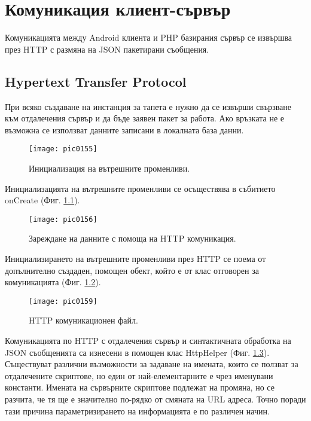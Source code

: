 \newpage
\chapter{Комуникация клиент-сървър}
\label{chapter06}

Комуникацията между Android клиента и PHP базирания сървър се извършва през HTTP с размяна на JSON пакетирани съобщения. 

\section{Hypertext Transfer Protocol}

При всяко създаване на инстанция за тапета е нужно да се извърши свързване към отдалечения сървър и да бъде заявен пакет за работа. Ако връзката не е възможна се използват данните записани в локалната база данни. 

\begin{figure}[h]
  \centering
  \texttt{[image: pic0155]}
  \caption{Инициализация на вътрешните променливи.}
\label{fig:pic0155}
\end{figure}
\FloatBarrier

Инициализацията на вътрешните променливи се осъществява в събитието onCreate (Фиг. \ref{fig:pic0155}).

\begin{figure}[h]
  \centering
  \texttt{[image: pic0156]}
  \caption{Зареждане на данните с помоща на HTTP комуникация.}
\label{fig:pic0156}
\end{figure}
\FloatBarrier

Инициализирането на вътрешните променливи през HTTP се поема от допълнително създаден, помощен обект, който е от клас отговорен за комуникацията (Фиг. \ref{fig:pic0156}). 

\begin{figure}[h]
  \centering
  \texttt{[image: pic0159]}
  \caption{HTTP комуникационен файл.}
\label{fig:pic0159}
\end{figure}
\FloatBarrier

Комуникацията  по HTTP с отдалечения сървър и синтактичната обработка на JSON съобщенията са изнесени в помощен клас HttpHelper (Фиг. \ref{fig:pic0159}). Съществуват различни възможности за задаване на имената, които се ползват за отдалечените скриптове, но един от най-елементарните е чрез именувани константи. Имената на сървърните скриптове подлежат на промяна, но се разчита, че тя ще е значително по-рядко от смяната на URL адреса. Точно поради тази причина параметризирането на информацията е по различен начин. 

